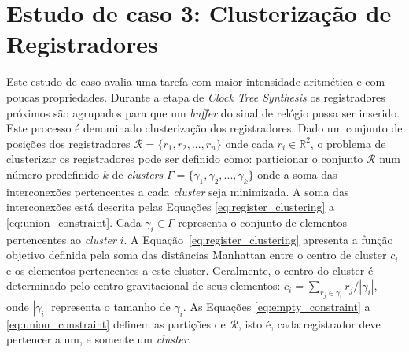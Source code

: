 



\section{Estudo de caso 3: Clusterização de Registradores}
\label{sec:estudo_de_caso_3}

Este estudo de caso avalia uma tarefa com maior intensidade aritmética e com poucas propriedades.
Durante a etapa de \textit{Clock Tree Synthesis} os registradores próximos são agrupados para que um \textit{buffer} do sinal de relógio possa ser inserido. Este processo é denominado clusterização dos registradores. Dado um conjunto de posições dos registradores $\mathcal{R} = \{r_1, r_2, ..., r_n\}$ onde cada $r_i \in \mathbb{R}^2$, o problema de clusterizar os registradores pode ser definido como: particionar o conjunto $\mathcal{R}$ num número predefinido $k$ de \textit{clusters} $\Gamma = \{\gamma_1, \gamma_2, ..., \gamma_k\}$ onde a soma das interconexões pertencentes a cada \textit{cluster} seja minimizada. A soma das interconexões está descrita pelas Equações \eqref{eq:register_clustering} a \eqref{eq:union_constraint}.
Cada $\gamma_i \in \Gamma$ representa o conjunto de elementos pertencentes ao \textit{cluster} $i$.
A Equação~\eqref{eq:register_clustering} apresenta a função objetivo definida pela soma das distâncias Manhattan entre o centro de cluster $c_i$ e os elementos pertencentes a este cluster.
Geralmente, o centro do cluster é determinado pelo centro gravitacional de seus elementos: $c_i = \sum_{r_j \in \gamma_i} r_j/|\gamma_i|$, onde $|\gamma_i|$ representa o tamanho  de $\gamma_i$.
As Equações \eqref{eq:empty_constraint} a \eqref{eq:union_constraint} definem as partições de $\mathcal{R}$, isto é, cada registrador deve pertencer a um, e somente um \textit{cluster}.


